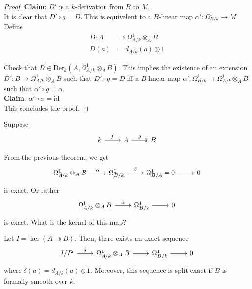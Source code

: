 \documentclass[oneside, 12pt]{scrbook}
\theoremstyle{theorem}
\begin{document}
\begin{proof}
\textbf{Claim}: $D'$ is a $k$-derivation from $B$ to $M$. \\

It is clear that $D' \circ g = D$. This is equivalent to a $B$-linear map $\alpha ' : \Omega_{B/k}^{1} \rightarrow M$. Define 
\begin{align*}
D: A &\rightarrow \Omega_{A/k}^{1} \otimes_{A} B \\
D(a) &= d_{A/k}(a) \otimes 1
\end{align*}

Check that $D\in \mathrm{Der}_{k}(A, \Omega_{A/k}^{1} \otimes_{A} B)$. This implies the existence of an extension $D' : B \rightarrow \Omega_{A/k}^{1} \otimes_{A} B$ such that $D' \circ g = D$ iff a $B$-linear map $\alpha ' : \Omega_{B/k}^{1} \rightarrow \Omega_{A/k}^{1} \otimes_{A} B$ such that $\alpha' \circ g = \alpha$. \\

\textbf{Claim}: $\alpha' \circ \alpha = \mathrm{id}$\\

This concludes the proof.
\end{proof}

Suppose \[\begin{tikzcd}
	{k } & A & B
	\arrow["g", two heads, from=1-2, to=1-3]
	\arrow["f", from=1-1, to=1-2]
\end{tikzcd}\] 

From the previous theorem, we get \[\begin{tikzcd}
	{\Omega_{A/k}^{1} \otimes_{A} B } & {\Omega_{B/k}^{1}} & {\Omega_{B/A}^{1}}=0 & 0
	\arrow["\alpha", from=1-1, to=1-2]
	\arrow["\beta", from=1-2, to=1-3]
	\arrow[from=1-3, to=1-4]
\end{tikzcd}\] is exact. Or rather \[\begin{tikzcd}
	{\Omega_{A/k}^{1} \otimes_{A} B } & {\Omega_{B/k}^{1}} &  0
	\arrow["\alpha", from=1-1, to=1-2]
	\arrow[from=1-2, to=1-3]
\end{tikzcd}\] is exact. What is the kernel of this map? 

\begin{theorem}
Let $I = \ker(A \twoheadrightarrow B)$. Then, there exists an exact sequence \[\begin{tikzcd}
	{I/I^2} & {\Omega_{A/k}^{1} \otimes_{A} B} & {\Omega_{B/k}^{1}} & 0
	\arrow[two heads, from=1-2, to=1-3]
	\arrow["\delta", from=1-1, to=1-2]
	\arrow[from=1-3, to=1-4]
\end{tikzcd}\] where $\delta(a) = d_{A/k} (a) \otimes 1$. Moreover, this sequence is split exact if $B$ is formally smooth over $k$.
\end{theorem}
\end{document}
